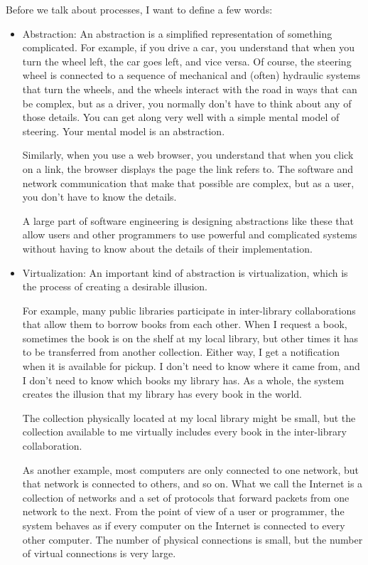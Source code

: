 \documentclass[12pt]{book}
\begin{document}
Before we talk about processes, I want to define a few words:

\begin{itemize}

\item Abstraction: An abstraction is a simplified representation
of something complicated.  For example, if you drive a car, you
understand that when you turn the wheel left, the car goes left,
and vice versa.  Of course, the steering wheel is connected to
a sequence of mechanical and (often) hydraulic systems that turn
the wheels, and the wheels interact with the road in ways that
can be complex, but as a driver, you normally don't have to think
about any of those details.  You can get along very well with
a simple mental model of steering.  Your mental model is an
abstraction.

Similarly, when you use a web browser, you understand that when
you click on a link, the browser displays the page the link refers
to.  The software and network communication that make that possible
are complex, but as a user, you don't have to know the
details.

A large part of software engineering is designing abstractions like
these that allow users and other programmers to use powerful
and complicated systems without having to know about the details
of their implementation.

\item Virtualization: An important kind of abstraction is
virtualization, which is the process of creating a desirable
illusion.

For example, many public libraries participate in inter-library
collaborations that allow them to borrow books from each other.
When I request a book, sometimes the book is on the shelf at my
local library, but other times it has to be transferred from another
collection.  Either way, I get a notification when it is available
for pickup.  I don't need to know where it came from, and I don't
need to know which books my library has.  As a whole, the system
creates the illusion that my library has every book in the world.

The collection physically located at my local library might be small,
but the collection available to me virtually includes every book
in the inter-library collaboration.

As another example, most computers are only connected to one
network, but that network is connected to others, and so on.  What
we call the Internet is a collection of networks and a set of
protocols that forward packets from one network to the next.
From the point of view of a user or programmer, the system behaves
as if every computer on the Internet is connected to every other
computer.  The number of physical connections is small, but the
number of virtual connections is very large.

\end{itemize}
\end{document}
